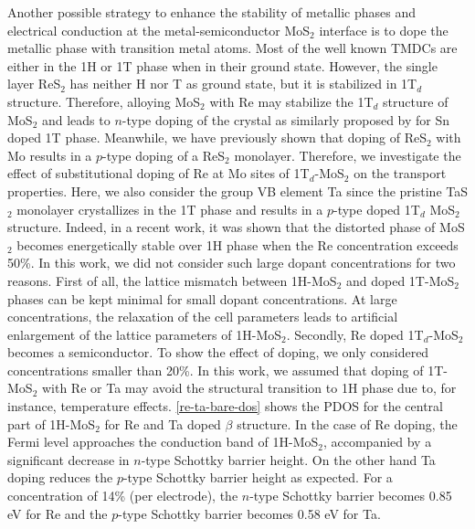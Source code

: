 Another possible strategy to enhance the stability of metallic phases and electrical conduction at the metal-semiconductor MoS$_2$ interface is to dope the metallic phase with transition metal atoms. Most of the well known TMDCs are either in the 1H or 1T phase when in their ground state. However, the single layer ReS$_2$ has neither H nor T as ground state, but it is stabilized in 1T$_d$ structure\cite{res2-cakir}. Therefore, alloying MoS$_2$ with Re may stabilize the 1T$_d$ structure of MoS$_{2}$ and leads to $n$-type doping of the crystal as similarly proposed by \citet{Raffone} for Sn doped 1T phase.  Meanwhile, we have previously shown that doping of ReS$_2$ with Mo results in a $p$-type doping of a ReS$_2$ monolayer\cite{res2-cakir}. Therefore, we investigate the effect of substitutional doping of Re at Mo sites of 1T$_d$-MoS$_2$ on the transport properties. Here, we also consider the group VB element Ta since the pristine TaS$_2$ monolayer crystallizes in the 1T phase and results in  a $p$-type doped 1T$_d$ MoS$_{2}$ structure. Indeed, in a recent work, it was shown that the distorted phase of MoS$_2$ becomes energetically stable over 1H phase when the Re concentration exceeds 50\%\cite{doi:10.1021/acs.jpcc.5b10739}. In this work, we did not consider such large dopant concentrations for two reasons. First of all, the lattice mismatch between 1H-MoS$_2$ and doped 1T-MoS$_2$ phases can be kept minimal for small dopant concentrations. At large concentrations, the relaxation of the cell parameters leads to artificial enlargement of the lattice parameters of  1H-MoS$_2$. Secondly, Re doped 1T$_d$-MoS$_2$ becomes a semiconductor. To show the effect of doping, we only considered concentrations smaller than 20\%.  In this work, we assumed that doping of 1T-MoS$_2$ with Re or Ta may avoid the structural transition to 1H phase due to, for instance, temperature effects. \autoref{re-ta-bare-dos} shows the PDOS for the central part of 1H-MoS$_2$ for Re and Ta doped $\beta$ structure. In the case of Re doping, the Fermi level approaches the conduction band of 1H-MoS$_2$, accompanied by a significant decrease in $n$-type Schottky barrier height. On the other hand Ta doping reduces the $p$-type Schottky barrier height as expected. For a concentration of 14\% (per electrode), the $n$-type Schottky barrier becomes 0.85 eV for Re and the $p$-type Schottky barrier becomes 0.58 eV for Ta.

